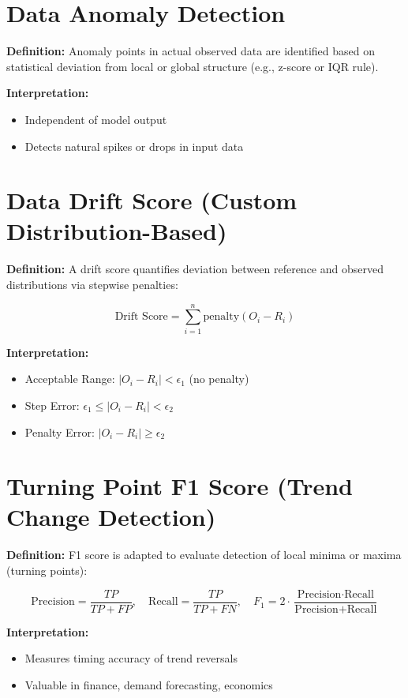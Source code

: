 \documentclass{article}
\begin{document}
\section{Data Anomaly Detection}
\textbf{Definition:}
Anomaly points in actual observed data are identified based on statistical deviation from local or global structure (e.g., z-score or IQR rule).

\textbf{Interpretation:}
\begin{itemize}
  \item Independent of model output
  \item Detects natural spikes or drops in input data
\end{itemize}

\section{Data Drift Score (Custom Distribution-Based)}
\textbf{Definition:}
A drift score quantifies deviation between reference and observed distributions via stepwise penalties:

\[
\text{Drift Score} = \sum_{i=1}^{n} \text{penalty}(O_i - R_i)
\]

\textbf{Interpretation:}
\begin{itemize}
  \item Acceptable Range: $|O_i - R_i| < \epsilon_1$ (no penalty)
  \item Step Error: $\epsilon_1 \leq |O_i - R_i| < \epsilon_2$
  \item Penalty Error: $|O_i - R_i| \geq \epsilon_2$
\end{itemize}

\section{Turning Point F1 Score (Trend Change Detection)}
\textbf{Definition:}
F1 score is adapted to evaluate detection of local minima or maxima (turning points):

\[
\text{Precision} = \frac{TP}{TP + FP}, \quad 
\text{Recall} = \frac{TP}{TP + FN}, \quad 
F_1 = 2 \cdot \frac{\text{Precision} \cdot \text{Recall}}{\text{Precision} + \text{Recall}}
\]

\textbf{Interpretation:}
\begin{itemize}
  \item Measures timing accuracy of trend reversals
  \item Valuable in finance, demand forecasting, economics
\end{itemize}
\end{document}
